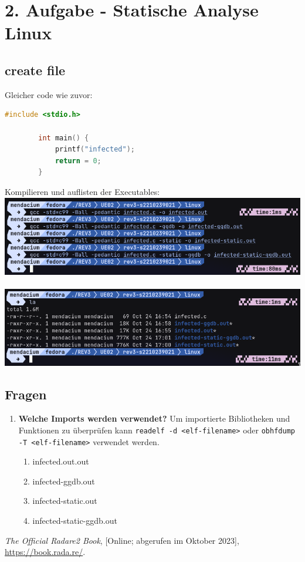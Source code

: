 \documentclass{article}
\begin{document}
	\section*{2. Aufgabe - Statische Analyse Linux}
	\subsection*{create file}
	Gleicher code wie zuvor:\\
	\begin{lstlisting}[language=c]
		#include <stdio.h>
		
		int main() {
			printf("infected");
			return = 0;
		}
	\end{lstlisting}
	Kompilieren und auflisten der Executables:\\
	\includegraphics[width=0.7\linewidth]{pictures/2. compile files}\\
	\\
	\includegraphics[width=0.5\linewidth]{pictures/2. all files}\\
	
	\subsection*{Fragen}
	\begin{enumerate}
		\item \textbf{Welche Imports werden verwendet?}
		Um importierte Bibliotheken und Funktionen zu überprüfen kann \texttt{readelf -d <elf-filename>} oder \texttt{obhfdump -T <elf-filename>} verwendet werden.
		\begin{enumerate}
			\item infected.out.out
			\item infected-ggdb.out
			\item infected-static.out
			\item infected-static-ggdb.out
		\end{enumerate}
	\end{enumerate}
	
	\pagebreak
	
	\begin{thebibliography}{9}
		
		\emph{The Official Radare2 Book},
		[Online; abgerufen im Oktober 2023],
		\url{https://book.rada.re/}.
		
	\end{thebibliography}
	
	
	\label{LastPage}
	
\end{document}
